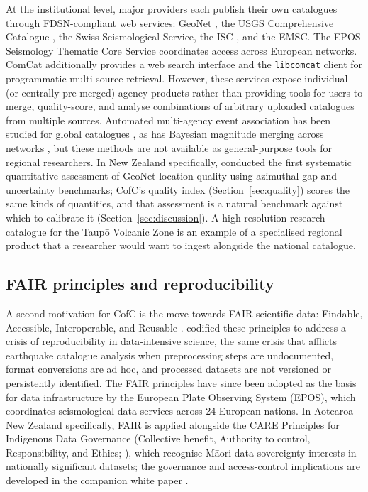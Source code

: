 \documentclass[12pt]{article}
\begin{document}
At the institutional level, major providers each publish their own catalogues
through FDSN-compliant web services: GeoNet \citep{petersen2011}, the USGS
Comprehensive Catalogue \citep[ComCat;][]{comcat}, the Swiss Seismological
Service, the ISC \citep{storchak2013}, and the EMSC.  The EPOS Seismology
Thematic Core Service coordinates access across European networks.  ComCat additionally provides a web search
interface and the \texttt{libcomcat} client for programmatic multi-source
retrieval.  However, these services expose individual (or centrally
pre-merged) agency products rather than providing tools for users to merge,
quality-score, and analyse combinations of arbitrary uploaded catalogues from
multiple sources.  Automated multi-agency event association has been studied for
global catalogues \citep{yeck2019}, as has Bayesian magnitude
merging across networks \citep{Si2024}, but these methods are not
available as general-purpose tools for regional researchers.  In New
Zealand specifically, \citet{warrensmith2025} conducted the first
systematic quantitative assessment of GeoNet location quality using
azimuthal gap and uncertainty benchmarks; CofC's quality index
(Section~\ref{sec:quality}) scores the same kinds of quantities, and that
assessment is a natural benchmark against which to calibrate it
(Section~\ref{sec:discussion}).  A high-resolution research catalogue for the
Taup\=o Volcanic Zone \citep{illsley2025} is an example of a specialised
regional product that a researcher would want to ingest alongside the national
catalogue.

\subsection{FAIR principles and reproducibility}
\label{sec:fair}

A second motivation for CofC is the move towards FAIR scientific
data: Findable, Accessible, Interoperable, and Reusable
\citep{wilkinson2016}.  \citet{wilkinson2016} codified these principles
to address a crisis of reproducibility in data-intensive science, the same
crisis that afflicts earthquake catalogue analysis when preprocessing steps
are undocumented, format conversions are ad hoc, and processed datasets are
not versioned or persistently identified.  The FAIR principles have since been
adopted as the basis for data infrastructure by the European Plate Observing
System (EPOS), which coordinates seismological data services across 24
European nations.  In Aotearoa New Zealand specifically, FAIR is
applied alongside the CARE Principles for Indigenous Data Governance
(Collective benefit, Authority to control, Responsibility, and Ethics;
\citealt{carroll2020}), which recognise M\=aori data-sovereignty
interests in nationally significant datasets; the governance and
access-control implications are developed in the companion white paper
\citep{graham2026fair}.
\end{document}
